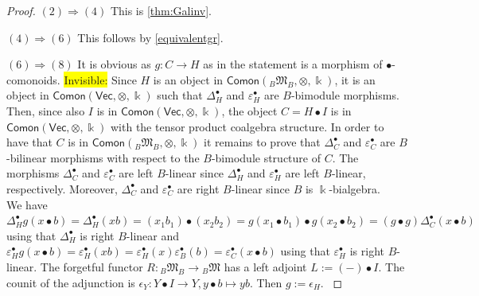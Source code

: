 \documentclass[nosumlimits,twoside]{amsart}
\theoremstyle{definition}
\theoremstyle{remark}
\newenvironment{invisible}{{\noindent\sc \colorbox{yellow}{Invisible:}\;}\color{gray}}{\medskip}
\newcommand{\mm}{\mathfrak{M}}
\newcommand{\ot}{\otimes}
\begin{document}
\begin{proof}
$(2)\Rightarrow(4)$ This is \cref{thm:Galinv}.

$(4)\Rightarrow(6)$ This follows by \cref{equivalentgr}.

$(6)\Rightarrow(8)$ It is obvious
as $g:C\to H$ as in the statement is a morphism of $\bullet$-comonoids.
\begin{invisible}
Since $H$ is an object in $\mathsf{Comon}(_{B}\mm_{B},\ot,\Bbbk)$, it is an object in $\mathsf{Comon}(\mathsf{Vec},\ot,\Bbbk)$ such that $\Delta^{\bullet}_{H}$ and $\varepsilon^{\bullet}_{H}$ are $B$-bimodule morphisms. Then, since also $I$ is in $\mathsf{Comon}(\mathsf{Vec},\ot,\Bbbk)$, the object $C=H\bullet I$ is in $\mathsf{Comon}(\mathsf{Vec},\ot,\Bbbk)$ with the tensor product coalgebra structure. In order to have that $C$ is in $\mathsf{Comon}(_{B}\mm_{B},\ot,\Bbbk)$ it remains to prove that $\Delta_{C}^{\bullet}$ and $\varepsilon_{C}^{\bullet}$ are $B$-bilinear morphisms with respect to the $B$-bimodule structure of $C$. The morphisms $\Delta_{C}^{\bullet}$ and $\varepsilon_{C}^{\bullet}$ are left $B$-linear since $\Delta^{\bullet}_{H}$ and $\varepsilon^{\bullet}_{H}$ are left $B$-linear, respectively. Moreover, $\Delta_{C}^{\bullet}$ and $\varepsilon_{C}^{\bullet}$ are right $B$-linear since $B$ is $\Bbbk$-bialgebra.\\
We have
$\Delta^{\bullet}_{H}g(x\bullet b)=\Delta_{H}^{\bullet}(xb)=(x_{1}b_{1})\bullet(x_{2}b_{2})=g(x_{1}\bullet b_{1})\bullet g(x_{2}\bullet b_{2})=(g\bullet g)\Delta_{C}^{\bullet}(x\bullet b)$ using that $\Delta_{H}^{\bullet}$ is right $B$-linear and $\varepsilon_{H}^{\bullet}g(x\bullet b)=\varepsilon_{H}^{\bullet}(xb)=\varepsilon_{H}^{\bullet}(x)\varepsilon_{B}^{\bullet}(b)=\varepsilon_{C}^{\bullet}(x\bullet b)$ using that $\varepsilon_{H}^{\bullet}$ is right $B$-linear. The forgetful functor $R:{}_B\mm_B\to{}_B\mm$ has a left adjoint $L:=(-)\bullet I$. The counit of the adjunction is $\epsilon_Y:Y\bullet I\to Y,y\bullet b\mapsto yb$. Then $g:=\epsilon_H.$
\end{invisible}


\end{proof}
\end{document}
